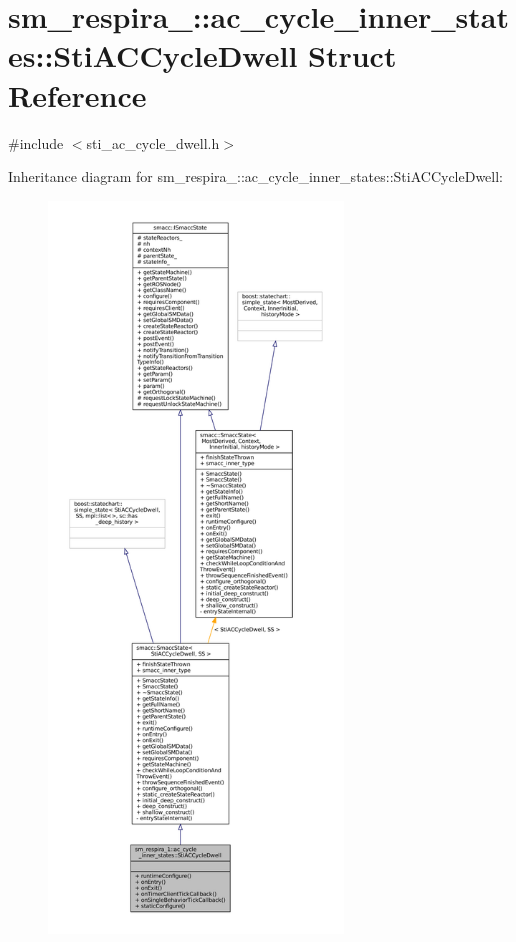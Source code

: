 \hypertarget{structsm__respira__1_1_1ac__cycle__inner__states_1_1StiACCycleDwell}{}\section{sm\+\_\+respira\+\_\+:\+:ac\+\_\+cycle\+\_\+inner\+\_\+states\+:\+:Sti\+A\+C\+Cycle\+Dwell Struct Reference}
\label{structsm__respira__1_1_1ac__cycle__inner__states_1_1StiACCycleDwell}


{\ttfamily \#include $<$sti\+\_\+ac\+\_\+cycle\+\_\+dwell.\+h$>$}



Inheritance diagram for sm\+\_\+respira\+\_\+:\+:ac\+\_\+cycle\+\_\+inner\+\_\+states\+:\+:Sti\+A\+C\+Cycle\+Dwell\+:
\nopagebreak
\begin{figure}[H]
\begin{center}
\leavevmode
\includegraphics[height=550pt]{structsm__respira__1_1_1ac__cycle__inner__states_1_1StiACCycleDwell__inherit__graph}
\end{center}
\end{figure}


